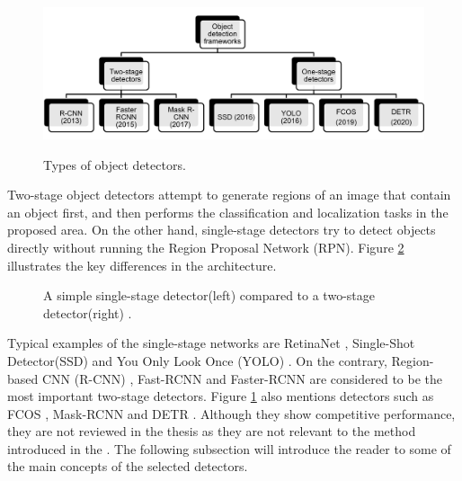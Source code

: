 \begin{figure}[htb]
	\begin{center}
		\includegraphics[width=16cm]{./OD.png}
	\end{center}
	\caption{Types of object detectors.}
	\begin{center}
		\label{OD}
	\end{center}
\end{figure}

Two-stage object detectors attempt to generate regions of an image that contain an object first, and then performs the classification and localization tasks in the proposed area. On the other hand, single-stage detectors try to detect objects directly without running the  Region Proposal Network (RPN). Figure \ref{fig:1vs2stage} illustrates the key differences in the architecture.

\begin{figure}[htb]
    \centering
    \qquad
    \caption{A simple single-stage detector(left) compared to a two-stage detector(right) \cite{app8091488}.}\label{fig:1vs2stage}%
\end{figure}

Typical examples of the single-stage networks are RetinaNet \cite{Lin2017}, Single-Shot Detector(SSD) \cite{Liu2015} and You Only Look Once (YOLO) \cite{Redmon2015a}. On the contrary, Region-based CNN (R-CNN) \cite{Girshick2013}, Fast-RCNN \cite{Girshick2015} and Faster-RCNN \cite{ima} are considered to be the most important two-stage detectors. Figure \ref{OD} also mentions detectors such as FCOS \cite{Tian2019}, Mask-RCNN \cite{He2017} and DETR \cite{Carion2020}. Although they show competitive performance, they are not reviewed in the thesis as they are not relevant to the method introduced in the .  The following subsection will introduce the reader to some of the main concepts of the selected detectors. 

